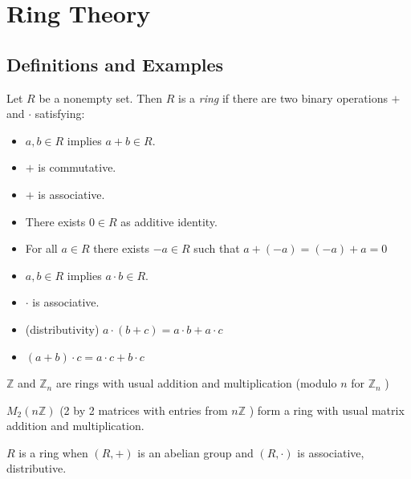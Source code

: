 
\section{Ring Theory}
\subsection{Definitions and Examples}

\begin{definition}[Ring]
	Let $R$ be a nonempty set. Then $R$ is a \textit{ring} if there are two binary operations $+$ and $\cdot$ satisfying:
	\begin{itemize}
		\item [R0] $a,b \in R$ implies $a+b \in R$.
		\item [R1] $+$ is commutative.
		\item [R2] $+$ is associative.
		\item [R3] There exists $0 \in R$ as additive identity.
		\item [R4] For all $a \in R$ there exists $-a \in R$ such that $a+(-a) = (-a)+a = 0$
		\item [M0] $a, b \in R$ implies $a \cdot b \in R$.
		\item [M1] $\cdot$ is associative.
		\item [D1] (distributivity) $a \cdot(b+c) = a\cdot b + a \cdot c$ 
		\item [D2]  $(a+b)\cdot c = a \cdot c + b \cdot c$
	\end{itemize}
\end{definition}

\begin{example}
	$\mathbb{Z}$ and $\mathbb{Z}_n$ are rings with usual addition and multiplication (modulo $n$ for $\mathbb{Z}_n$ )

	$M_2(n\mathbb{Z})$ (2 by 2 matrices with entries from $n\mathbb{Z}$ ) form a ring with usual matrix addition and multiplication.
\end{example}

\begin{remark}
	$R$ is a ring when $(R, +)$ is an abelian group and $(R, \cdot)$ is associative, distributive.
\end{remark}

